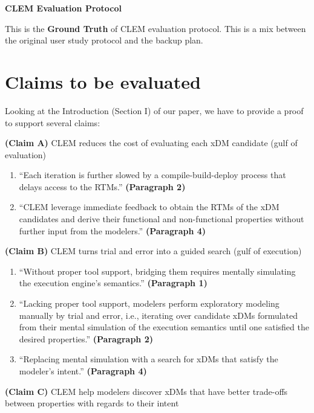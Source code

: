 \documentclass[11pt,a4paper]{article}
\begin{document}
{\LARGE\bfseries CLEM Evaluation Protocol}
\vspace{1em}

This is the \textbf{Ground Truth} of CLEM evaluation protocol. This is a mix between the original user study protocol and the backup plan.

\section{Claims to be evaluated}

Looking at the Introduction (Section I) of our paper, we have to provide a proof to support several claims:

\textbf{(Claim A)} CLEM reduces the cost of evaluating each xDM candidate (gulf of evaluation)

\begin{enumerate}
    \item ``Each iteration is further slowed by a compile-build-deploy process that delays access to the RTMs.'' \textbf{(Paragraph 2)}
    \item ``CLEM leverage immediate feedback to obtain the RTMs of the xDM candidates and derive their functional and non-functional properties without further input from the modelers.'' \textbf{(Paragraph 4)}
\end{enumerate}

\textbf{(Claim B)} CLEM turns trial and error into a guided search (gulf of execution)

\begin{enumerate}
    \item ``Without proper tool support, bridging them requires mentally simulating the execution engine's semantics.'' \textbf{(Paragraph 1)}
    \item ``Lacking proper tool support, modelers perform exploratory modeling manually by trial and error, i.e., iterating over candidate xDMs formulated from their mental simulation of the execution semantics until one satisfied the desired properties.'' \textbf{(Paragraph 2)} 
    \item ``Replacing mental simulation with a search for xDMs that satisfy the modeler's intent.'' \textbf{(Paragraph 4)} 
\end{enumerate}

\textbf{(Claim C)} CLEM help modelers discover xDMs that have better trade-offs between properties with regards to their intent
\end{document}

